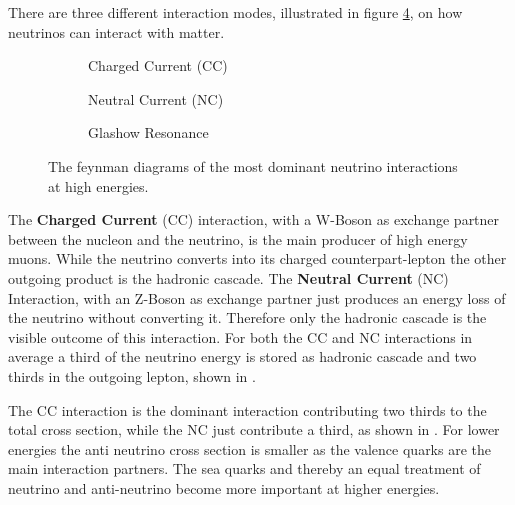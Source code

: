 There are three different interaction modes, illustrated in figure \ref{fig:feyn_nu}, on how neutrinos can interact with matter.
\begin{figure}
    \begin{subfigure}{0.31\textwidth}
        \centering
        
        \caption{Charged Current (CC)}
        \label{fig:feyn_nu_cc}
    \end{subfigure}
    \hfill
    \begin{subfigure}{0.31\textwidth}
        \centering
        
        \caption{Neutral Current (NC)}
        \label{fig:feyn_nu_nc}
    \end{subfigure}
    \hfill
    \begin{subfigure}{0.31\textwidth}
        \centering
        
        \caption{Glashow Resonance}
        \label{fig:feyn_glashow}
    \end{subfigure}
    \caption{The feynman diagrams of the most dominant neutrino interactions at high energies.}
    \label{fig:feyn_nu}
\end{figure}

The \textbf{Charged Current} (CC) interaction, with a W-Boson as exchange partner between the nucleon and the neutrino, is the main producer of high energy muons.
While the neutrino converts into its charged counterpart-lepton the other outgoing product is the hadronic cascade.
The \textbf{Neutral Current} (NC) Interaction, with an Z-Boson as exchange partner just produces an energy loss of the neutrino without converting it.
Therefore only the hadronic cascade is the visible outcome of this interaction.
For both the CC and NC interactions in average a third of the neutrino energy is stored as hadronic cascade and two thirds in the outgoing lepton, shown in .

The CC interaction is the dominant interaction contributing two thirds to the total cross section, while the NC just contribute a third, as shown in .
For lower energies the anti neutrino cross section is smaller as the valence quarks are the main interaction partners.
The sea quarks and thereby an equal treatment of neutrino and anti-neutrino become more important at higher energies.

